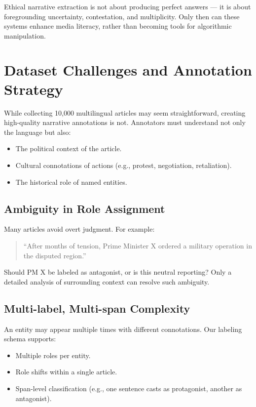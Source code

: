 \documentclass[12pt]{article}
\begin{document}
Ethical narrative extraction is not about producing perfect answers — it is about foregrounding uncertainty, contestation, and multiplicity. Only then can these systems enhance media literacy, rather than becoming tools for algorithmic manipulation.



\section{Dataset Challenges and Annotation Strategy}

While collecting 10,000 multilingual articles may seem straightforward, creating high-quality narrative annotations is not. Annotators must understand not only the language but also:
\begin{itemize}
    \item The political context of the article.
    \item Cultural connotations of actions (e.g., protest, negotiation, retaliation).
    \item The historical role of named entities.
\end{itemize}

\subsection{Ambiguity in Role Assignment}

Many articles avoid overt judgment. For example:
\begin{quote}
“After months of tension, Prime Minister X ordered a military operation in the disputed region.”
\end{quote}
Should PM X be labeled as antagonist, or is this neutral reporting? Only a detailed analysis of surrounding context can resolve such ambiguity.

\subsection{Multi-label, Multi-span Complexity}

An entity may appear multiple times with different connotations. Our labeling schema supports:
\begin{itemize}
    \item Multiple roles per entity.
    \item Role shifts within a single article.
    \item Span-level classification (e.g., one sentence casts as protagonist, another as antagonist).
\end{itemize}
\end{document}
